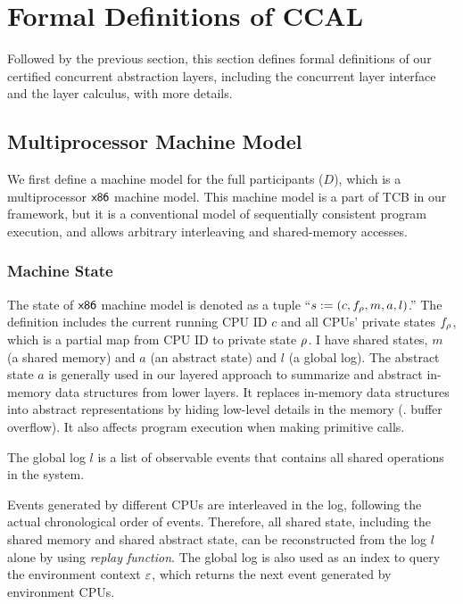 \section{Formal Definitions of CCAL}
\label{chapter:ccal:sec:interface-calculus}

Followed by the previous section, 
this section defines formal definitions of our certified concurrent abstraction layers,
including the concurrent layer interface and the layer calculus, 
 with more details. 


\subsection{Multiprocessor Machine Model}
\label{boot-total}

We first define a machine model for the full participants ($D$), which is a multiprocessor $\mathsf{x86}$ machine model. 
This machine model is a part of TCB in our framework, but 
it  is a conventional model of sequentially consistent program
execution, and allows arbitrary interleaving
and shared-memory
accesses. 


\subsubsection{Machine State} 
The state of  $\mathsf{x86}$ machine model is denoted as a tuple ``$s := (c, f_\rho, m, a, l)$.''
The definition includes
the current running CPU ID $c$ and 
all CPUs' private states $f_\rho$, which is a partial map from CPU ID to  private state $\rho$.
I have shared states,
$m$ (a shared memory) and $a$ (an abstract state)
and $l$ (a global log).
The abstract state $a$  is generally used in our layered approach to
summarize and abstract in-memory data structures from lower layers.
It replaces in-memory data structures into abstract representations 
by hiding low-level details in the memory (\eg. buffer overflow). 
It also affects program execution when making primitive calls. 

The global log $l$ is a list of observable events 
that contains all shared operations in the system. 


Events generated by different CPUs are
interleaved in the log, following the actual chronological order of events.
Therefore, all shared state, including the shared memory
and shared abstract state, can be reconstructed
from the log $l$ alone by using \emph{replay function}.
The global log is also used as an index to query the environment context
$\oracle$, which returns the next event generated by environment CPUs.





